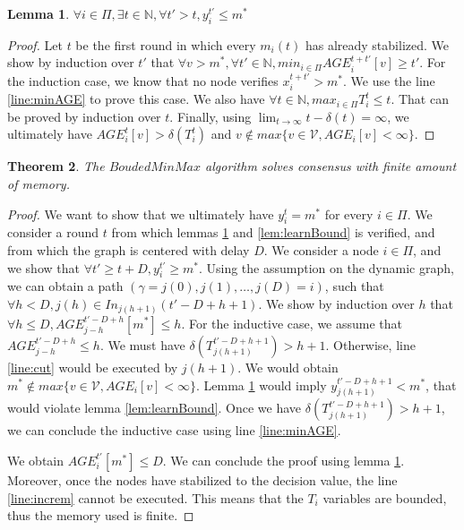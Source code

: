 \documentclass[11pt,letterpaper]{article}
\newtheorem{thm}{Theorem}
\newtheorem{lem}[thm]{Lemma}
\begin{document}
\begin{lem} \label{lem:supprOld}
	$\forall i \in \Pi, \exists t \in \mathds{N}, \forall t' > t, y_i^{t'} \leq m^*$
\end{lem}
\begin{proof}
	Let $t$ be the first round in which every $m_i(t)$ has already stabilized.
	We show by induction over $t'$ that $\forall v > m^*, \forall t' \in \mathds{N}, min_{i \in \Pi} AGE_i^{t+t'}[v] \geq t'$.
	For the induction case, we know that no node verifies $x_i^{t+t'} > m^*$. We use the line \ref{line:minAGE} to prove this case.
	We also have $\forall t \in \mathds{N}, max_{i \in \Pi} T_i^t \leq t$. That can be proved by induction over $t$.
	Finally, using $\lim_{t \rightarrow \infty} t-\delta(t) = \infty$, we ultimately have $AGE_i^t[v] > \delta(T_i^t)$ and $v \notin max \{v \in \mathcal{V}, AGE_i[v] < \infty\}$.
\end{proof}

\begin{thm}
	The $BoudedMinMax$ algorithm solves consensus with finite amount of memory.
\end{thm}
\begin{proof}
	We want to show that we ultimately have $y_i^t = m^*$ for every $i \in \Pi$.
	We consider a round $t$ from which lemmas \ref{lem:supprOld} and \ref{lem:learnBound} is verified, and from which the graph is centered with delay $D$.
	We consider a node $i \in \Pi$, and we show that $\forall t' \geq t+D, y_i^{t'} \geq m^*$.
	Using the assumption on the dynamic graph, we can obtain a path $(\gamma = j(0), j(1), \dots, j(D) = i)$,
	such that $\forall h < D, j(h) \in In_{j(h+1)}(t'-D+h+1)$.
	We show by induction over $h$ that $\forall h \leq D, AGE_{j-h}^{t'-D+h}[m^*] \leq h$.
	For the inductive case, we assume that $AGE_{j-h}^{t'-D+h} \leq h$.
	We must have $\delta(T_{j(h+1)}^{t'-D+h+1}) > h+1$.
	Otherwise, line \ref{line:cut} would be executed by $j(h+1)$. We would obtain $m^* \notin max \{v \in \mathcal{V}, AGE_i[v] < \infty\}$.
	Lemma \ref{lem:supprOld} would imply $y_{j(h+1)}^{t'-D+h+1} < m^*$, that would violate lemma \ref{lem:learnBound}.
	Once we have $\delta(T_{j(h+1)}^{t'-D+h+1}) > h+1$, we can conclude the inductive case using line \ref{line:minAGE}.

	We obtain $AGE_i^{t'}[m^*] \leq D$. We can conclude the proof using lemma \ref{lem:supprOld}.
	Moreover, once the nodes have stabilized to the decision value, the line \ref{line:increm} cannot be executed.
	This means that the $T_i$ variables are bounded, thus the memory used is finite.
\end{proof}
\end{document}
